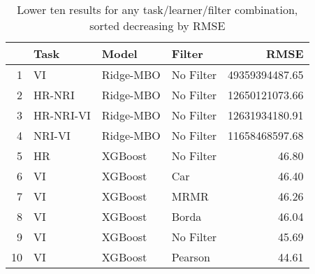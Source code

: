 \begin{table}[ht!]
\centering
\caption{Lower ten results for any task/learner/filter combination, sorted decreasing by RMSE} 
\label{tab:perf-worst-10}
\begin{tabular}{rlllr}
  \hline
 & Task & Model & Filter & RMSE \\ 
  \hline
1 & VI & Ridge-MBO & No Filter & 49359394487.65 \\ 
  2 & HR-NRI & Ridge-MBO & No Filter & 12650121073.66 \\ 
  3 & HR-NRI-VI & Ridge-MBO & No Filter & 12631934180.91 \\ 
  4 & NRI-VI & Ridge-MBO & No Filter & 11658468597.68 \\ 
  5 & HR & XGBoost & No Filter & 46.80 \\ 
  6 & VI & XGBoost & Car & 46.40 \\ 
  7 & VI & XGBoost & MRMR & 46.26 \\ 
  8 & VI & XGBoost & Borda & 46.04 \\ 
  9 & VI & XGBoost & No Filter & 45.69 \\ 
  10 & VI & XGBoost & Pearson & 44.61 \\ 
   \hline
\end{tabular}
\end{table}
